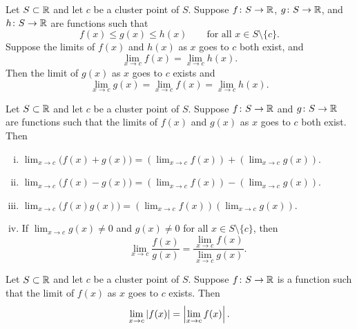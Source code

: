 \begin{cor} \label{fsqueeze:cor}
Let $S \subset {\mathbb{R}}$ and let $c$ be a cluster point of $S$.
Suppose $f \colon S \to {\mathbb{R}}$,
$g \colon S \to {\mathbb{R}}$, and $h \colon S \to {\mathbb{R}}$ are functions such that
\begin{equation*}
f(x) \leq g(x) \leq h(x) \qquad \text{for all } x \in S \setminus \{ c \}.
\end{equation*}
Suppose the limits of $f(x)$ and $h(x)$ as $x$ goes to $c$ both exist, and
\begin{equation*}
\lim_{x\to c} f(x) = \lim_{x\to c} h(x) .
\end{equation*}
Then the limit of $g(x)$ as $x$ goes to $c$ exists and
\begin{equation*}
\lim_{x\to c} g(x) =
\lim_{x\to c} f(x) = \lim_{x\to c} h(x) .
\end{equation*}
\end{cor}

\begin{cor} \label{falg:cor}
Let $S \subset {\mathbb{R}}$ and let $c$ be a cluster point of $S$.  
Suppose $f \colon S \to {\mathbb{R}}$ and
$g \colon S \to {\mathbb{R}}$ are functions
such that 
the limits of $f(x)$ and $g(x)$ as $x$ goes to $c$ both exist.
Then
\begin{enumerate}[(i)]
\item
$\displaystyle
\lim_{x\to c} \bigl(f(x)+g(x)\bigr) = \left(\lim_{x\to c} f(x)\right) + 
\left(\lim_{x\to c} g(x)\right) .
$
\item
$\displaystyle
\lim_{x\to c} \bigl(f(x)-g(x)\bigr) = \left(\lim_{x\to c} f(x)\right) -
\left(\lim_{x\to c} g(x)\right) .
$
\item
$\displaystyle
\lim_{x\to c} \bigl(f(x)g(x)\bigr) = \left(\lim_{x\to c} f(x)\right)
\left(\lim_{x\to c} g(x)\right) .
$
\item \label{falg:cor:iv} If
$\displaystyle \lim_{x\to c} g(x) \not= 0$
and $g(x) \not= 0$ for all $x \in S \setminus \{ c \}$, then
\begin{equation*}
\lim_{x\to c} \frac{f(x)}{g(x)} =
\frac{\lim_{x\to c} f(x)}{\lim_{x\to c} g(x)} .
\end{equation*}
\end{enumerate}
\end{cor}

\begin{cor} \label{fabs:cor}
Let $S \subset {\mathbb{R}}$ and let $c$ be a cluster point of $S$.
Suppose $f \colon S \to {\mathbb{R}}$ is a function such that the limit of $f(x)$ as $x$ goes to $c$
exists.
Then
\begin{equation*}
\lim_{x\to c} \left\lvert {f(x)} \right\rvert =
\left\lvert {\lim_{x\to c} f(x)} \right\rvert.
\end{equation*}
\end{cor}

